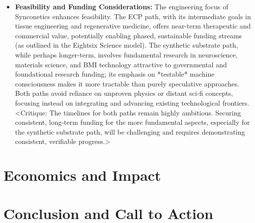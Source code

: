 \documentclass[10pt]{article}
\begin{document}
\begin{sloppypar}
\begin{itemize}
    \item \textbf{Feasibility and Funding Considerations:} The engineering focus of Synconetics enhances feasibility. The ECP path, with its intermediate goals in tissue engineering and regenerative medicine, offers near-term therapeutic and commercial value, potentially enabling phased, sustainable funding streams (as outlined in the Eightsix Science model). The synthetic substrate path, while perhaps longer-term, involves fundamental research in neuroscience, materials science, and BMI technology attractive to governmental and foundational research funding; its emphasis on *testable* machine consciousness makes it more tractable than purely speculative approaches. Both paths avoid reliance on unproven physics or distant sci-fi concepts, focusing instead on integrating and advancing existing technological frontiers. <Critique: The timelines for both paths remain highly ambitious. Securing consistent, long-term funding for the more fundamental aspects, especially for the synthetic substrate path, will be challenging and requires demonstrating consistent, verifiable progress.>

  \end{itemize}

  \section{Economics and Impact}
  \label{sec:economics}

  \section{Conclusion and Call to Action}
  \label{sec:conclusion}


  \pagebreak
  
  
  \nocite{*}

\end{sloppypar}
\end{document}
